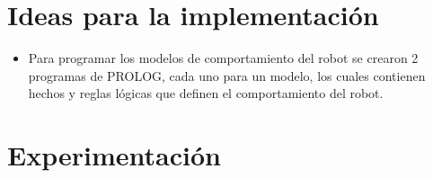 \documentclass[12pt]{article}
\begin{document}
\section{Ideas para la implementaci\'on}
\begin{itemize}
	\item Para programar los modelos de comportamiento del robot se crearon
	2 programas de PROLOG, cada uno para un modelo, los cuales contienen 
	hechos y reglas l\'ogicas que definen el comportamiento del robot.
\end{itemize}
\section{Experimentaci\'on}
\end{document}
